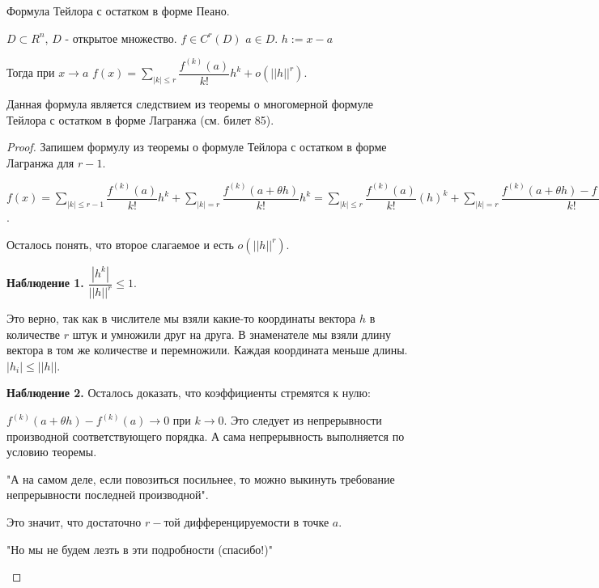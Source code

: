 
\begin{theorem}
	
	Формула Тейлора с остатком в форме Пеано.
	
	$D \subset R^n$, $D$ - открытое множество. $f \in C^{r}(D)$ $a \in D$. $h := x - a$
	
	Тогда при $x \rightarrow a$ $f(x) = \sum\limits_{|k| \leq r}\dfrac{f^{(k)}(a)}{k!}h^k + o(||h||^r)$.
	
	\begin{remark}
		
		Данная формула является следствием из теоремы о многомерной формуле Тейлора с остатком в форме Лагранжа (см. билет 85).
	\end{remark}
	
\end{theorem}

\begin{proof}
	
	Запишем формулу из теоремы о формуле Тейлора с остатком в форме Лагранжа для $r - 1$.
	
	$f(x) = \sum\limits_{|k| \leq r - 1} \dfrac{f^{(k)}(a)}{k!}h^k + \sum\limits_{|k| = r} \dfrac{f^{(k)}(a + \theta h)}{k!}h^k = \sum\limits_{|k| \leq r}\dfrac{f^{(k)}(a)}{k!}(h)^k + \sum\limits_{|k| = r}\dfrac{f^{(k)}(a + \theta h) - f^{(k)}(a)}{k!}h^k$.
	
	Осталось понять, что второе слагаемое и есть $ o(||h||^r)$.
	
	\textbf{Наблюдение 1.}
	$\dfrac{|h^k|}{||h||^r} \leq 1$.
	
	Это верно, так как в числителе мы взяли какие-то координаты вектора $h$ в количестве $r$ штук и умножили друг на друга. В знаменателе мы взяли длину вектора в том же количестве и перемножили. Каждая координата меньше длины. $|h_i| \leq ||h||$. 
	
	\textbf{Наблюдение 2.}
	Осталось доказать, что коэффициенты стремятся к нулю:
	
	$f^{(k)}(a + \theta h) - f^{(k)}(a) \rightarrow 0$ при $k \rightarrow 0$. Это следует из непрерывности производной соответствующего порядка. А сама непрерывность выполняется по условию теоремы.
	
	\begin{remark}
		
		"А на самом деле, если повозиться посильнее, то можно выкинуть требование непрерывности последней производной".
		
		Это значит, что достаточно $r-$той дифференцируемости в точке $a$.
		
		"Но мы не будем лезть в эти подробности (спасибо!)"
	\end{remark}
	
\end{proof}

